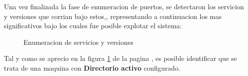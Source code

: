 \documentclass[a4paper]{article} %
\begin{document}
    Una vez finalizada la fase de enumeracion de puertos, se detectaron los servicion y versiones que corrian bajo estos,, representando a continuacion los mas significativos bajo los cuales fue posible explotar el sistema:
    \begin{figure}[h]
       \centering 
        \caption{Enumeracion de servicios y versiones}
        \label{fig:servicesResults} %
    \end{figure}

    \vspace{0.2cm}

    Tal y como se aprecio en la figura \ref{fig:servicesResults} de la pagina \pageref{fig:servicesResults}, es posible identificar que se trata de una maquina con \textbf{Directorio activo} configurado.  %
\end{document}
